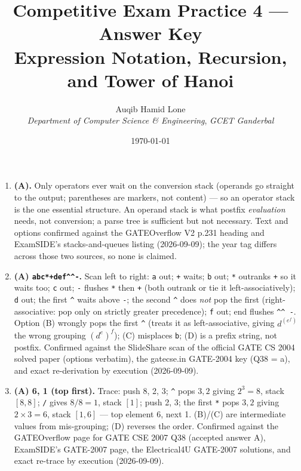 \documentclass[11pt]{article}
\title{Competitive Exam Practice 4 --- Answer Key\\\large Expression Notation, Recursion, and Tower of Hanoi}
\author{Auqib Hamid Lone\\[0.3em]
  \emph{Department of Computer Science \& Engineering}, \emph{GCET Ganderbal}}
\date{\today}
\begin{document}
\maketitle

\begin{enumerate}
\item[\textbf{Q1}] \textbf{(A).} Only operators ever wait on the conversion stack (operands go straight to the output; parentheses are markers, not content) --- so an operator stack is the one essential structure. An operand stack is what postfix \emph{evaluation} needs, not conversion; a parse tree is sufficient but not necessary. Text and options confirmed against the GATEOverflow V2 p.231 heading and ExamSIDE's stacks-and-queues listing (2026-09-09); the year tag differs across those two sources, so none is claimed.

\item[\textbf{Q2}] \textbf{(A) \texttt{abc*+def\^{}\^{}-}.} Scan left to right: \texttt{a} out; \texttt{+} waits; \texttt{b} out; \texttt{*} outranks \texttt{+} so it waits too; \texttt{c} out; \texttt{-} flushes \texttt{*} then \texttt{+} (both outrank or tie it left-associatively); \texttt{d} out; the first \texttt{\^{}} waits above \texttt{-}; the second \texttt{\^{}} does \emph{not} pop the first (right-associative: pop only on strictly greater precedence); \texttt{f} out; end flushes \texttt{\^{}\^{} -}. Option (B) wrongly pops the first \texttt{\^{}} (treats it as left-associative, giving $d^{(e^{f})}$ the wrong grouping $(d^{e})^{f}$); (C) misplaces \texttt{b}; (D) is a prefix string, not postfix. Confirmed against the SlideShare scan of the official GATE CS 2004 solved paper (options verbatim), the gatecse.in GATE-2004 key (Q38 = a), and exact re-derivation by execution (2026-09-09).

\item[\textbf{Q3}] \textbf{(A) 6, 1 (top first).} Trace: push 8, 2, 3; \texttt{\^{}} pops $3, 2$ giving $2^{3} = 8$, stack $[8, 8]$; \texttt{/} gives $8/8 = 1$, stack $[1]$; push 2, 3; the first \texttt{*} pops $3, 2$ giving $2 \times 3 = 6$, stack $[1, 6]$ --- top element 6, next 1. (B)/(C) are intermediate values from mis-grouping; (D) reverses the order. Confirmed against the GATEOverflow page for GATE CSE 2007 Q38 (accepted answer A), ExamSIDE's GATE-2007 page, the Electrical4U GATE-2007 solutions, and exact re-trace by execution (2026-09-09).


\end{enumerate}
\end{document}
